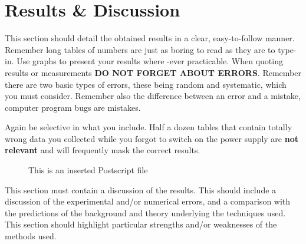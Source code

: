 \section{Results \& Discussion}

This section should detail the obtained results in a clear,
easy-to-follow manner. Remember long tables of numbers are just as boring to
read as they are to type-in. Use graphs to present your results where
-ever practicable. When quoting results or measurements
{\bf DO NOT FORGET ABOUT ERRORS}. Remember there are two basic types
of errors, these being random and systematic, which you must consider.
Remember also the difference between an error and a mistake, computer
program bugs are mistakes.

 
Again be selective in what you include. Half a dozen
tables that contain totally wrong data you collected while you forgot
to switch on the power supply are {\bf not relevant} and will frequently
mask the correct results. 
%
%
\begin{figure}[htb]     %
        \begin{center}
                \leavevmode             %
                \epsfxsize=90mm         %
\end{center}
\caption{This is an inserted Postscript file}
\end{figure}

This section must contain a discussion of the results. This should
include a discussion of the experimental and/or numerical errors, and a
comparison with the predictions of the background and theory underlying
the techniques used. This section should highlight particular strengths
and/or weaknesses of the methods used.